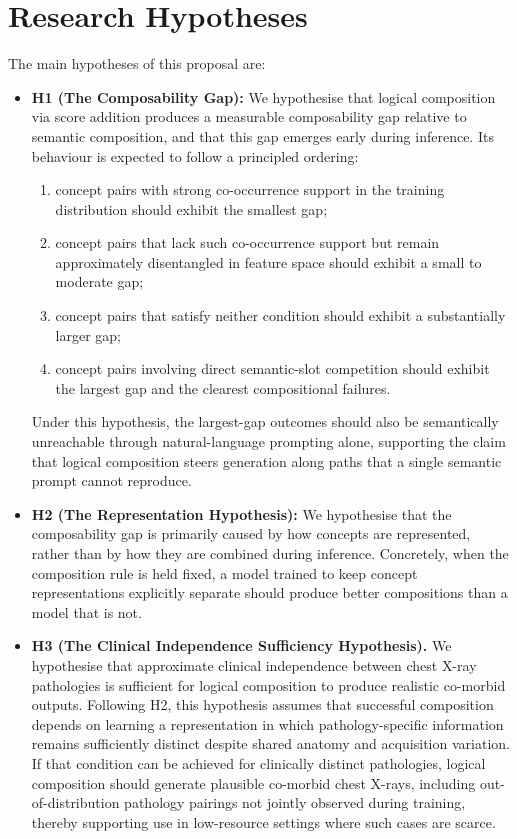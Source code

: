 
\section{Research Hypotheses}
\label{sec:research_objectives_research_hypothesis}

The main hypotheses of this proposal are:
\begin{itemize}
    \item \textbf{H1 (The Composability Gap):}
    We hypothesise that logical composition via score addition produces a measurable composability gap relative to semantic composition, and that this gap emerges early during inference.
    Its behaviour is expected to follow a principled ordering:
    \begin{enumerate}
        \item concept pairs with strong co-occurrence support in the training distribution should exhibit the smallest gap;
        \item concept pairs that lack such co-occurrence support but remain approximately disentangled in feature space should exhibit a small to moderate gap;
        \item concept pairs that satisfy neither condition should exhibit a substantially larger gap;
        \item concept pairs involving direct semantic-slot competition should exhibit the largest gap and the clearest compositional failures.
    \end{enumerate}

    Under this hypothesis, the largest-gap outcomes should also be semantically unreachable through natural-language prompting alone, supporting the claim that logical composition steers generation along paths that a single semantic prompt cannot reproduce.


    \item \textbf{H2 (The Representation Hypothesis):}
    We hypothesise that the composability gap is primarily caused by how concepts are represented, rather than by how they are combined during inference.
    Concretely, when the composition rule is held fixed, a model trained to keep concept representations explicitly separate should produce better compositions than a model that is not.

    \item \textbf{H3 (The Clinical Independence Sufficiency Hypothesis).}
    We hypothesise that approximate clinical independence between chest X-ray pathologies is sufficient for logical composition to produce realistic co-morbid outputs.
    Following H2, this hypothesis assumes that successful composition depends on learning a representation in which pathology-specific information remains sufficiently distinct despite shared anatomy and acquisition variation.
    If that condition can be achieved for clinically distinct pathologies, logical composition should generate plausible co-morbid chest X-rays, including out-of-distribution pathology pairings not jointly observed during training, thereby supporting use in low-resource settings where such cases are scarce.


\end{itemize}
